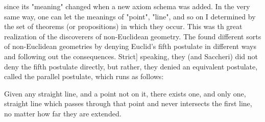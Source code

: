 since its "meaning" changed when a new axiom schema was added. In the very same way, one can let the meanings of "point", "line", and so on I determined by the set of theorems (or propositions) in which they occur. This was th great realization of the discoverers of non-Euclidean geometry. The found different sorts of non-Euclidean geometries by denying Euclid's fifth postulate in different ways and following out the consequences. Strict] speaking, they (and Saccheri) did not deny the fifth postulate directly, but rather, they denied an equivalent postulate, called the parallel postulate, which runs as follows: 

Given any straight line, and a point not on it, there exists one, and only one, straight line which passes through that point and never intersects the first line, no matter how far they are extended. 

